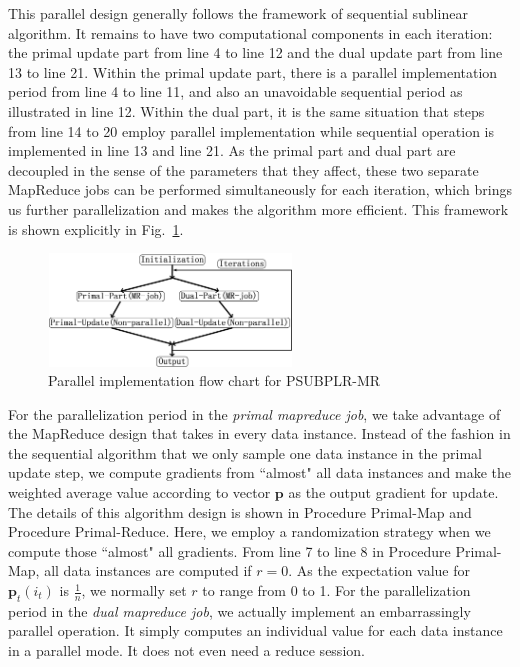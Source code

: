 \documentclass[10pt, conference, compsocconf]{IEEEtran}
\newcommand{\bp}{\mathbf{p}}
\begin{document}
This parallel design generally follows the framework of sequential sublinear algorithm.
It remains to have two computational components in each iteration: the primal update part from line 4 to line 12 and the dual update part from line 13 to line 21.
Within the primal update part, there is a parallel implementation period from line 4 to line 11, and also an unavoidable sequential period as illustrated in line 12.
Within the dual part, it is the same situation that steps from line 14 to 20 employ parallel implementation while sequential operation is implemented in line 13 and line 21.
As the primal part and dual part are decoupled in the sense of the parameters that they affect, these two separate MapReduce jobs can be performed simultaneously for each iteration, which brings us further parallelization and makes the algorithm more efficient.
This framework is shown explicitly in Fig.~\ref{fig:frame}.
%
\begin{figure}[tb]
\center \includegraphics[height=3.0cm,width=6.5cm]{img/framework.png}\vspace{-0.3cm}
\caption{Parallel implementation flow chart for PSUBPLR-MR}\label{fig:frame}\vspace{-0.5cm}
\end{figure}
%

For the parallelization period in the \textit{primal mapreduce job}, we take advantage of the MapReduce design that takes in every data instance.
Instead of the fashion in the sequential algorithm that we only sample one data instance in the primal update step, we compute gradients from ``almost" all data instances and make the weighted average value according to vector $\bp$ as the output gradient for update.
The details of this algorithm design is shown in Procedure Primal-Map and Procedure Primal-Reduce.
Here, we employ a randomization strategy when we compute those ``almost" all gradients.
From line 7 to line 8 in Procedure Primal-Map, all data instances are computed if $r=0$.
As the expectation value for $\bp_t(i_t)$ is $\frac{1}{n}$, we normally set $r$ to range from 0 to 1.
For the parallelization period in the \textit{dual mapreduce job}, we actually implement an embarrassingly parallel operation.
It simply computes an individual value for each data instance in a parallel mode. It does not even need a reduce session.
\end{document}
